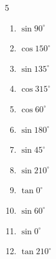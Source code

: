 \begin{multicols}{5}
\begin{enumerate}

\columnbreak %

  \item $\displaystyle \sin{90^\circ}$

        \phantom{$\displaystyle =1$}

  \item $\displaystyle \cos{150^\circ}$


  \item $\displaystyle \sin{135^\circ}$


  \item $\displaystyle \cos{315^\circ}$


  \item $\displaystyle \cos{60^\circ}$


  \item $\displaystyle \sin{180^\circ}$

        \phantom{$\displaystyle =0$}

  \item $\displaystyle \sin{45^\circ}$


  \item $\displaystyle \sin{210^\circ}$


  \item $\displaystyle \tan{0^\circ}$

        \phantom{$\displaystyle =0$}

  \item $\displaystyle \sin{60^\circ}$


  \item $\displaystyle \sin{0^\circ}$

        \phantom{$\displaystyle =0$}

  \item $\displaystyle \tan{210^\circ}$



\end{enumerate}
\end{multicols}
